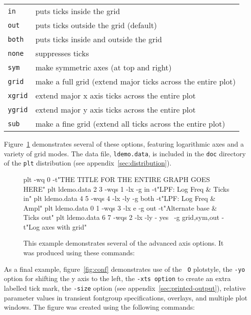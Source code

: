 \documentclass{book}
\begin{document}
\begin{description}
\begin{tabular}{ll}
{\tt in} & puts ticks inside the grid \\
{\tt out} & puts ticks outside the grid (default) \\
{\tt both} & puts ticks inside and outside the grid \\
{\tt none} & suppresses ticks \\
{\tt sym} & make symmetric axes (at top and right) \\
{\tt grid} & make a full grid (extend major ticks across the entire plot) \\
{\tt xgrid} & extend major x axis ticks across the entire plot \\
{\tt ygrid} & extend major y axis ticks across the entire plot \\
{\tt sub} & make a fine grid (extend all ticks across the entire plot)
\end{tabular}
\end{description}

Figure~\ref{fig:example17} demonstrates several of these options,
featuring logarithmic axes and a variety of grid modes.  The data
file, {\tt ldemo.data}, is included in the {\tt doc} directory of the
{\tt plt} distribution (see appendix~\ref{sec:distribution}).

\begin{figure}
\begin{center}
\end{center}
\caption[Advanced axis options]{This example demonstrates several of the
advanced axis options.  It was produced using these commands:
\label{fig:example17}}

\begin{center}
\begin{boxedverbatim}
plt -wq 0 -t"THE TITLE FOR THE ENTIRE GRAPH GOES HERE"
plt ldemo.data 2 3 -wqs 1 -lx -g in -t"LPF: Log Freq & Ticks in"
plt ldemo.data 4 5 -wqs 4 -lx -ly -g both -t"LPF: Log Freq & Ampl"
plt ldemo.data 0 1 -wqs 3 -lx e -g out  -t"Alternate base & Ticks out"
plt ldemo.data 6 7 -wqs 2 -lx -ly - yes \
 -g grid,sym,out -t"Log axes with grid"
\end{boxedverbatim}
\end{center}
\end{figure}

%
%
As a final example, figure~\ref{fig:conf} demonstrates use of the {\tt
O} plotstyle, the {\tt -yo} option for shifting the y axis to the
left, the {\tt -xts option} to create an extra labelled tick mark, the
{\tt -size} option (see appendix~\ref{sec:printed-output}), relative
parameter values in transient fontgroup specifications, overlays, and
multiple plot windows.  The figure was created using the following commands:
\end{document}
